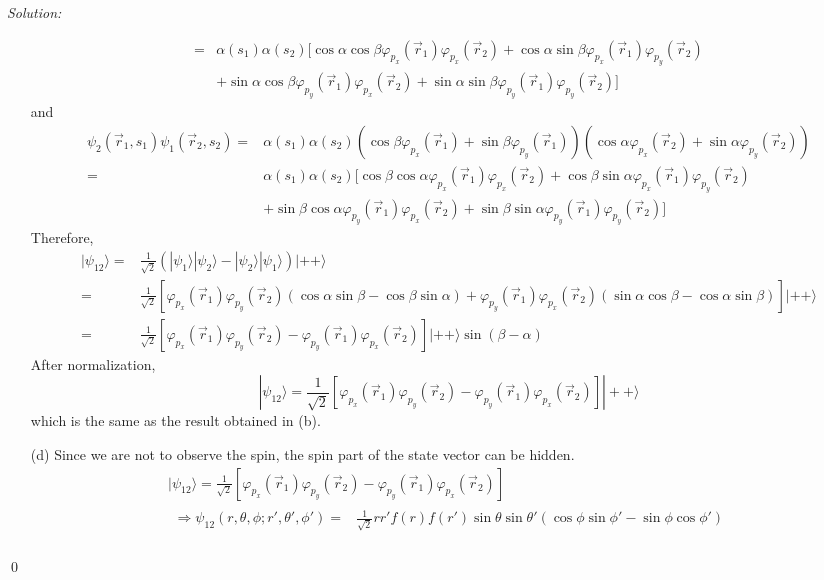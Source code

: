 \documentclass[10pt,a4paper]{article}
\newenvironment{sol}
    {\emph{Solution:}
    }
    {
    \qed
    }
\begin{document}
\begin{sol}
\begin{itemize}
\begin{align}
\nonumber=&\alpha(s_1)\alpha(s_2)[\cos\alpha\cos\beta\varphi_{p_x}(\vec{r}_1)\varphi_{p_x}(\vec{r}_2)+\cos\alpha\sin\beta\varphi_{p_x}(\vec{r}_1)\varphi_{p_y}(\vec{r}_2)\\
&+\sin\alpha\cos\beta\varphi_{p_y}(\vec{r}_1)\varphi_{p_x}(\vec{r}_2)+\sin\alpha\sin\beta\varphi_{p_y}(\vec{r}_1)\varphi_{p_y}(\vec{r}_2)]
\end{align}
and
\begin{align}
\nonumber\psi_2(\vec{r}_1,s_1)\psi_1(\vec{r}_2,s_2)=&\alpha(s_1)\alpha(s_2)(\cos\beta\varphi_{p_x}(\vec{r}_1)+\sin\beta\varphi_{p_y}(\vec{r}_1))(\cos\alpha\varphi_{p_x}(\vec{r}_2)+\sin\alpha\varphi_{p_y}(\vec{r}_2))\\
\nonumber=&\alpha(s_1)\alpha(s_2)[\cos\beta\cos\alpha\varphi_{p_x}(\vec{r}_1)\varphi_{p_x}(\vec{r}_2)+\cos\beta\sin\alpha\varphi_{p_x}(\vec{r}_1)\varphi_{p_y}(\vec{r}_2)\\
&+\sin\beta\cos\alpha\varphi_{p_y}(\vec{r}_1)\varphi_{p_x}(\vec{r}_2)+\sin\beta\sin\alpha\varphi_{p_y}(\vec{r}_1)\varphi_{p_y}(\vec{r}_2)]
\end{align}
Therefore,
\begin{align}
\nonumber|\psi_{12}\rangle=&\frac{1}{\sqrt{2}}(|\psi_1\rangle|\psi_2\rangle-|\psi_2\rangle|\psi_1\rangle)|++\rangle\\
\nonumber=&\frac{1}{\sqrt{2}}[\varphi_{p_x}(\vec{r}_1)\varphi_{p_y}(\vec{r}_2)(\cos\alpha\sin\beta-\cos\beta\sin\alpha)+\varphi_{p_y}(\vec{r}_1)\varphi_{p_x}(\vec{r}_2)(\sin\alpha\cos\beta-\cos\alpha\sin\beta)]|++\rangle\\
\nonumber=&\frac{1}{\sqrt{2}}[\varphi_{p_x}(\vec{r}_1)\varphi_{p_y}(\vec{r}_2)-\varphi_{p_y}(\vec{r}_1)\varphi_{p_x}(\vec{r}_2)]|++\rangle\sin(\beta-\alpha)
\end{align}
After normalization,
\begin{equation}
|\psi_{12}\rangle=\frac{1}{\sqrt{2}}[\varphi_{p_x}(\vec{r}_1)\varphi_{p_y}(\vec{r}_2)-\varphi_{p_y}(\vec{r}_1)\varphi_{p_x}(\vec{r}_2)]|++\rangle
\end{equation}
which is the same as the result obtained in (b).
\item[(d)] Since we are not to observe the spin, the spin part of the state vector can be hidden.
\begin{gather}
|\psi_{12}\rangle=\frac{1}{\sqrt{2}}[\varphi_{p_x}(\vec{r}_1)\varphi_{p_y}(\vec{r}_2)-\varphi_{p_y}(\vec{r}_1)\varphi_{p_x}(\vec{r}_2)]\\
\begin{align}
\Longrightarrow\psi_{12}(r,\theta,\phi;r',\theta',\phi')=&\frac{1}{\sqrt{2}}rr'f(r)f(r')\sin\theta\sin\theta'(\cos\phi\sin\phi'-\sin\phi\cos\phi')\\

\end{align}
\end{gather}
\end{itemize}
\end{sol}
\end{document}
